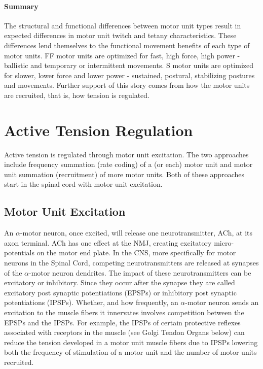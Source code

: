 \paragraph{Summary}
The structural and functional differences between motor unit types result in expected differences in motor unit twitch and tetany characteristics. These differences lend themselves to the functional movement benefits of each type of motor units. FF motor units are optimized for fast, high force, high power - ballistic and temporary or intermittent movements. S motor units are optimized for slower, lower force and lower power - sustained, postural, stabilizing postures and movements. Further support of this story comes from how the motor units are recruited, that is, how tension is regulated.

\section{Active Tension Regulation}

Active tension is regulated through motor unit excitation. The two approaches include frequency summation (rate coding) of a (or each) motor unit and motor unit summation (recruitment) of more motor units. Both of these approaches start in the spinal cord with motor unit excitation.

\subsection{Motor Unit Excitation}

An $\alpha$-motor neuron, once excited, will release one neurotransmitter, ACh, at its axon terminal. ACh has one effect at the NMJ, creating excitatory micro-potentials on the motor end plate. In the CNS, more specifically for motor neurons in the Spinal Cord, competing neurotransmitters are released at synapses of the $\alpha$-motor neuron dendrites. The impact of these neurotransmitters can be excitatory or inhibitory. Since they occur after the synapse they are called excitatory post synaptic potentiations (EPSPs) or inhibitory post synaptic potentiations (IPSPs). Whether, and how frequently, an $\alpha$-motor neuron sends an excitation to the muscle fibers it innervates involves competition between the EPSPs and the IPSPs. For example, the IPSPs of certain protective reflexes associated with receptors in the muscle (see Golgi Tendon Organs below) can reduce the tension developed in a motor unit muscle fibers due to IPSPs lowering both the frequency of stimulation of a motor unit and the number of motor units recruited.

